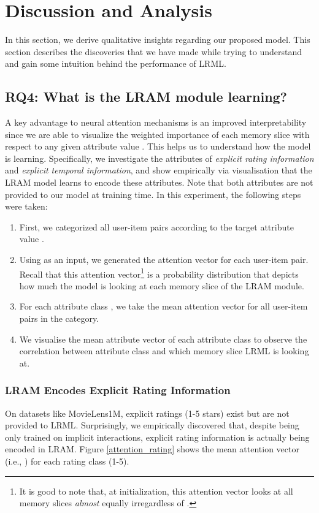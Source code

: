 \documentclass[sigconf]{acmart}
\begin{document}
\section{Discussion and Analysis}
In this section, we derive qualitative insights regarding our proposed model. This section describes the discoveries that we have made while trying to understand and gain some intuition behind the performance of \textsc{LRML}.

\subsection{RQ4: What is the LRAM module learning?}
A key advantage to neural attention mechanisms is an improved interpretability since we are able to visualize the weighted importance of each memory slice with respect to any given attribute value . This helps us to understand how the model is learning. Specifically, we investigate the attributes of \textit{explicit rating information} and \textit{explicit temporal information}, and show empirically via visualisation that the LRAM model learns to encode these attributes. Note that both attributes are not provided to our model at training time. In this experiment, the following steps were taken:
\begin{enumerate}
\item First, we categorized all user-item pairs  according to the target attribute value .
\item Using  as an input, we generated the attention vector  for each user-item pair. Recall that this attention vector\footnote{It is good to note that, at initialization, this attention vector looks at all memory slices \textit{almost} equally irregardless of .}  is a probability distribution that depicts how much the model is looking at each memory slice of the LRAM module. 
\item For each attribute class , we take the mean attention vector for all user-item pairs in the category. 
\item We visualise the mean attribute vector of each attribute class to observe the correlation between attribute class and which memory slice \textsc{LRML} is looking at. 
\end{enumerate}


\subsubsection{LRAM Encodes Explicit Rating Information}
On datasets like MovieLens1M, explicit ratings (1-5 stars) exist but are not provided to \textsc{LRML}. Surprisingly, we empirically discovered that, despite being only trained on implicit interactions, explicit rating information is actually being encoded in LRAM. Figure \ref{attention_rating} shows the mean attention vector (i.e., ) for each rating class (1-5).
\end{document}
